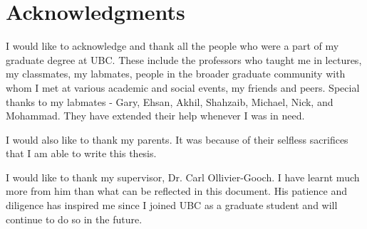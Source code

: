 
\chapter{Acknowledgments}

I would like to acknowledge and thank all the people who were a part of my graduate degree at UBC. These include the professors who taught me in lectures, my classmates, my labmates, people in the broader graduate community with whom I met at various academic and social events, my friends and peers. Special thanks to my labmates - Gary, Ehsan, Akhil, Shahzaib, Michael, Nick, and Mohammad. They have extended their help whenever I was in need.

I would also like to thank my parents. It was because of their selfless sacrifices that I am able to write this thesis.

I would like to thank my supervisor, Dr. Carl Ollivier-Gooch. I have learnt much more from him than what can be reflected in this document. His patience and diligence has inspired me since I joined UBC as a graduate student and will continue to do so in the future.




